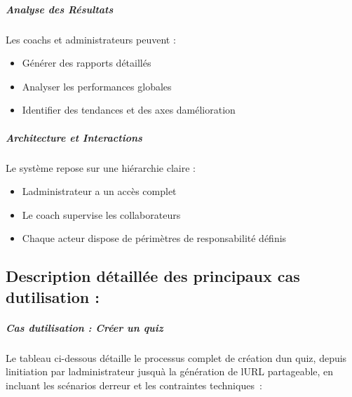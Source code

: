 \documentclass[12pt,a4paper,twoside,openright]{report}
\begin{document}
\hypertarget{analyse-des-ruxe9sultats}{%
\subparagraph{Analyse des Résultats}\label{analyse-des-ruxe9sultats}}

Les coachs et administrateurs peuvent :

\begin{itemize}
\item
  Générer des rapports détaillés
\item
  Analyser les performances globales
\item
  Identifier des tendances et des axes d\textquotesingle amélioration
\end{itemize}

\hypertarget{architecture-et-interactions}{%
\subparagraph{Architecture et
Interactions}\label{architecture-et-interactions}}

Le système repose sur une hiérarchie claire :

\begin{itemize}
\item
  L\textquotesingle administrateur a un accès complet
\item
  Le coach supervise les collaborateurs
\item
  Chaque acteur dispose de périmètres de responsabilité définis
\end{itemize}

\hypertarget{description-duxe9tailluxe9e-des-principaux-cas-dutilisation}{%
\subsection{Description détaillée des principaux cas
d\textquotesingle utilisation
:}\label{description-duxe9tailluxe9e-des-principaux-cas-dutilisation}}

\hypertarget{cas-dutilisation-cruxe9er-un-quiz}{%
\subparagraph{Cas d\textquotesingle utilisation : Créer un
quiz}\label{cas-dutilisation-cruxe9er-un-quiz}}

Le tableau ci-dessous détaille le processus complet de création
d\textquotesingle un quiz, depuis l\textquotesingle initiation par
l\textquotesingle administrateur jusqu\textquotesingle à la génération
de l\textquotesingle URL partageable, en incluant les scénarios
d\textquotesingle erreur et les contraintes techniques~:
\end{document}
